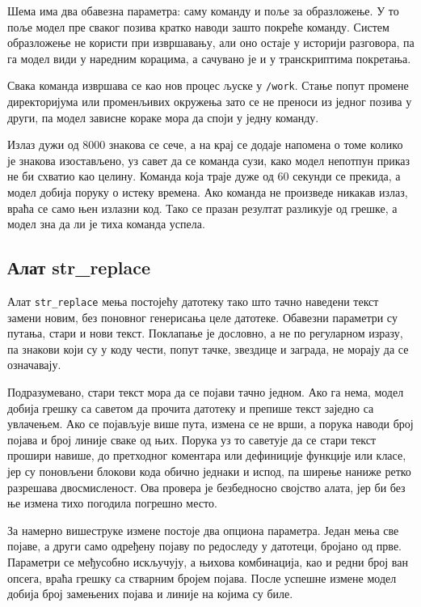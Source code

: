 \documentclass[12pt,a4paper]{report}
\begin{document}
	Шема има два обавезна параметра: саму команду и поље за образложење. У то
	поље модел пре сваког позива кратко наводи зашто покреће команду. Систем
	образложење не користи при извршавању, али оно остаје у историји разговора,
	па га модел види у наредним корацима, а сачувано је и у транскриптима
	покретања.

	Свака команда извршава се као нов процес љуске у \texttt{/work}. Стање попут
	промене директоријума или променљивих окружења зато се не преноси из једног
	позива у други, па модел зависне кораке мора да споји у једну команду.

	Излаз дужи од 8000 знакова се сече, а на крај се додаје напомена о томе
	колико је знакова изостављено, уз савет да се команда сузи, како модел
	непотпун приказ не би схватио као целину. Команда која траје дуже од 60
	секунди се прекида, а модел добија поруку о истеку времена. Ако команда не
	произведе никакав излаз, враћа се само њен излазни код. Тако се празан
	резултат разликује од грешке, а модел зна да ли је тиха команда успела.

	\subsection{Алат str\_replace}

	Алат \texttt{str\_replace} мења постојећу датотеку тако што тачно наведени
	текст замени новим, без поновног генерисања целе датотеке. Обавезни
	параметри су путања, стари и нови текст. Поклапање је дословно, а не по
	регуларном изразу, па знакови који су у коду чести, попут тачке, звездице и
	заграда, не морају да се означавају.

	Подразумевано, стари текст мора да се појави тачно једном. Ако га нема,
	модел добија грешку са саветом да прочита датотеку и препише текст заједно
	са увлачењем. Ако се појављује више пута, измена се не врши, а порука наводи
	број појава и број линије сваке од њих. Порука уз то саветује да се стари
	текст прошири навише, до претходног коментара или дефиниције функције или
	класе, јер су поновљени блокови кода обично једнаки и испод, па ширење
	наниже ретко разрешава двосмисленост. Ова провера је безбедносно својство
	алата, јер би без ње измена тихо погодила погрешно место.

	За намерно вишеструке измене постоје два опциона параметра. Један мења све
	појаве, а други само одређену појаву по редоследу у датотеци, бројано од
	прве. Параметри се међусобно искључују, а њихова комбинација, као и редни
	број ван опсега, враћа грешку са стварним бројем појава. После успешне
	измене модел добија број замењених појава и линије на којима су биле.
\end{document}
